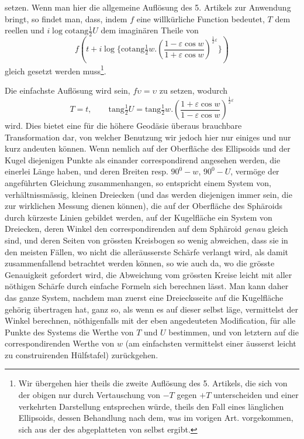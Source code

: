 %
\noindent setzen. Wenn man hier die allgemeine Auflösung des 5. Artikels zur Anwendung bringt, so findet man, dass, indem \(f\) eine willkürliche Function bedeutet, \(T\) dem reellen und \(i\log\mathrm{cotang}\tfrac{1}{2}U\) dem imaginären Theile von
\[
f(t+i\log\{\mathrm{cotang}\tfrac{1}{2}w\mathord{.}(\frac{1-\varepsilon\cos w}{1+\varepsilon\cos w})^{\frac{1}{2}\varepsilon}\})
\]
\noindent gleich gesetzt werden muss\footnote{Wir übergehen hier theils die zweite Auflösung des 5. Artikels, die sich von der obigen nur durch Vertauschung von \(-T\) gegen \(+T\) unterscheiden und einer verkehrten Darstellung entsprechen würde, theils den Fall eines länglichen Ellipsoids, dessen Behandlung nach dem, was im vorigen Art. vorgekommen, sich aus der des abgeplatteten von selbst ergibt.}.

Die einfachste Auflösung wird sein, \(f\upsilon=\upsilon\) zu setzen, wodurch
\[
T=t,\qquad \mathrm{tang}\tfrac{1}{2}U=\mathrm{tang}\tfrac{1}{2}w\mathord{.}(\frac{1+\varepsilon\cos w}{1-\varepsilon\cos w})^{\frac{1}{2}\varepsilon}
\]
\noindent wird. Dies bietet eine für die höhere Geodäsie überaus brauchbare Transformation dar, von welcher Benutzung wir jedoch hier nur einiges und nur kurz andeuten können. Wenn nemlich auf der Oberfläche des Ellipsoids und der Kugel diejenigen Punkte als einander correspondirend angesehen werden, die einerlei Länge haben, und deren Breiten resp. \(90^0-w\), \(90^0-U\), vermöge der angeführten Gleichung zusammenhangen, so entspricht einem System von, verhältnissmässig, kleinen Dreiecken (und das werden diejenigen immer sein, die zur wirklichen Messung dienen können), die auf der Oberfläche des Sphäroids durch kürzeste Linien gebildet werden, auf der Kugelfläche ein System von Dreiecken, deren Winkel den correspondirenden auf dem Sphäroid \textit{genau} gleich sind, und deren Seiten von grössten Kreisbogen so wenig abweichen, dass sie in den meisten Fällen, wo nicht die alleräusserste Schärfe verlangt wird, als damit zusammenfallend betrachtet werden können, so wie auch da, wo die grösste Genauigkeit gefordert wird, die Abweichung vom grössten Kreise leicht mit aller nöthigen Schärfe durch einfache Formeln sich berechnen lässt. Man kann daher das ganze System, nachdem man zuerst eine Dreiecksseite auf die Kugelfläche gehörig übertragen hat, ganz so, als wenn es auf dieser selbst läge, vermittelst der Winkel berechnen, nöthigenfalls mit der eben angedeuteten Modification, für alle Punkte des Systems die Werthe von \(T\) und \(U\) bestimmen, und von letztern auf die correspondirenden Werthe von \(w\) (am einfachsten vermittelst einer äusserst leicht zu construirenden Hülfstafel) zurückgehen.
